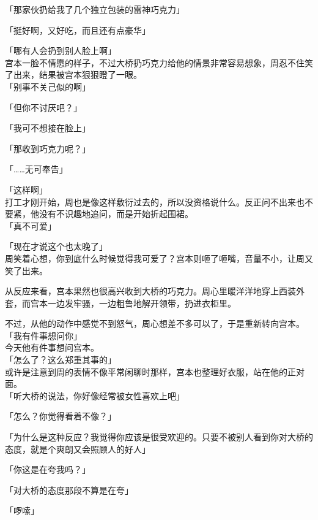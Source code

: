 「那家伙扔给我了几个独立包装的雷神巧克力」

「挺好啊，又好吃，而且还有点豪华」

「哪有人会扔到别人脸上啊」\\

宫本一脸不情愿的样子，不过大桥扔巧克力给他的情景非常容易想象，周忍不住笑了出来，结果被宫本狠狠瞪了一眼。\\

「别事不关己似的啊」

「但你不讨厌吧？」

「我可不想接在脸上」

「那收到巧克力呢？」

「……无可奉告」

「这样啊」\\

打工才刚开始，周也是像这样敷衍过去的，所以没资格说什么。反正问不出来也不要紧，他没有不识趣地追问，而是开始折起围裙。\\

「真不可爱」

「现在才说这个也太晚了」\\

周笑着心想，你到底什么时候觉得我可爱了？宫本则咂了咂嘴，音量不小，让周又笑了出来。

从反应来看，宫本果然也很高兴收到大桥的巧克力。周心里暖洋洋地穿上西装外套，而宫本一边发牢骚，一边粗鲁地解开领带，扔进衣柜里。

不过，从他的动作中感觉不到怒气，周心想差不多可以了，于是重新转向宫本。\\

「我有件事想问你」\\

今天他有件事想问宫本。\\

「怎么了？这么郑重其事的」\\

或许是注意到周的表情不像平常闲聊时那样，宫本也整理好衣服，站在他的正对面。\\

「听大桥的说法，你好像经常被女性喜欢上吧」

「怎么？你觉得看着不像？」

「为什么是这种反应？我觉得你应该是很受欢迎的。只要不被别人看到你对大桥的态度，就是个爽朗又会照顾人的好人」

「你这是在夸我吗？」

「对大桥的态度那段不算是在夸」

「啰嗦」\\


